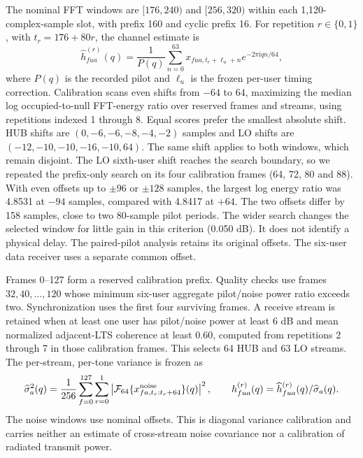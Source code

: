 \documentclass[10pt,letterpaper]{article}
\begin{document}
The nominal FFT windows are $[176,240)$ and $[256,320)$ within each
1,120-complex-sample slot, with prefix 160 and cyclic prefix 16.
For repetition $r\in\{0,1\}$, with $t_r=176+80r$, the channel estimate is
\begin{equation}
 \widehat h^{(r)}_{fua}(q)=\frac{1}{P(q)}
 \sum_{n=0}^{63}x_{fua,t_r+\ell_u+n}e^{-2\pi\mathrm{i}qn/64},
 \label{supp:eq_renew_fft}
\end{equation}
where $P(q)$ is the recorded pilot and $\ell_u$ is the frozen per-user timing
correction. Calibration scans even shifts from $-64$ to $64$, maximizing
the median log occupied-to-null FFT-energy ratio over reserved frames and
streams, using repetitions indexed 1 through 8. Equal scores prefer the
smallest absolute shift. HUB shifts are $(0,-6,-6,-8,-4,-2)$ samples and LO
shifts are $(-12,-10,-10,-16,-10,64)$. The same shift applies to both windows,
which remain disjoint. The LO sixth-user shift reaches the search boundary,
so we repeated the prefix-only search on its four calibration frames (64, 72, 80 and 88). With even offsets up to $\pm96$ or $\pm128$ samples, the largest log energy ratio was 4.8531 at $-94$ samples, compared with 4.8417 at $+64$. The two offsets differ by 158 samples, close to two 80-sample pilot periods. The wider search changes the selected window for little gain in this criterion (0.050 dB). It does not identify a physical delay. The paired-pilot analysis retains its original offsets. The six-user data receiver uses a separate common offset.

Frames 0--127 form a reserved calibration prefix. Quality checks use frames
$32,40,\ldots,120$ whose minimum six-user aggregate pilot/noise power ratio
exceeds two. Synchronization uses the first four surviving frames. A receive
stream is retained when at least one user has pilot/noise power at least
6 dB and mean normalized adjacent-LTS coherence at least 0.60, computed
from repetitions 2 through 7 in those calibration frames. This selects
64 HUB and 63 LO streams. The per-stream, per-tone variance is frozen as
\begin{equation}
 \widehat\sigma_a^2(q)=\frac{1}{256}\sum_{f=0}^{127}\sum_{r=0}^{1}
 \left|\mathcal F_{64}\{x^{\rm noise}_{fa,t_r:t_r+64}\}(q)\right|^2,
 \qquad h^{(r)}_{fua}(q)=\widehat h^{(r)}_{fua}(q)/\widehat\sigma_a(q).
\end{equation}
The noise windows use nominal offsets. This is diagonal variance calibration
and carries neither an estimate of cross-stream noise covariance nor a
calibration of radiated transmit power.
\end{document}
